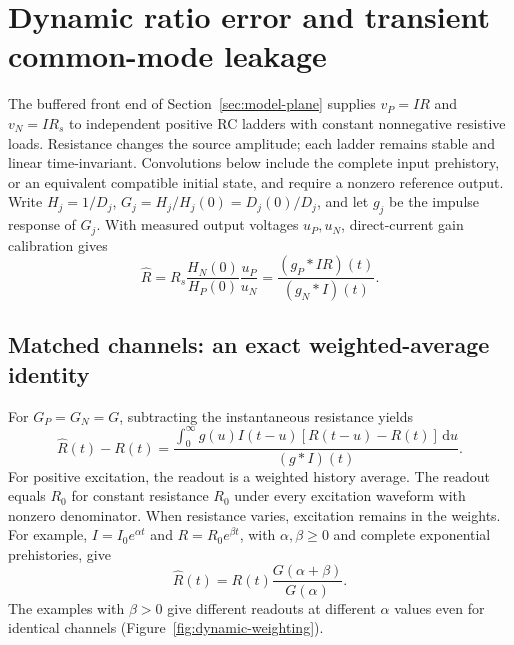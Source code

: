 \section{Dynamic ratio error and transient common-mode leakage}
\label{sec:dynamic}

The buffered front end of Section~\ref{sec:model-plane} supplies $v_P=IR$ and $v_N=IR_s$ to independent positive RC ladders with constant nonnegative resistive loads. Resistance changes the source amplitude; each ladder remains stable and linear time-invariant. Convolutions below include the complete input prehistory, or an equivalent compatible initial state, and require a nonzero reference output. Write $H_j=1/D_j$, $G_j=H_j/H_j(0)=D_j(0)/D_j$, and let $g_j$ be the impulse response of $G_j$. With measured output voltages $u_P,u_N$, direct-current gain calibration gives
\begin{equation}\label{eq:ratio-readout}
\hat R=R_s\frac{H_N(0)}{H_P(0)}\frac{u_P}{u_N}
=\frac{(g_P\ast IR)(t)}{(g_N\ast I)(t)}.
\end{equation}

\subsection{Matched channels: an exact weighted-average identity}
\label{sec:dynamic-matched}

For $G_P=G_N=G$, subtracting the instantaneous resistance yields
\begin{equation}\label{eq:weighted-average}
\hat R(t)-R(t)=\frac{\displaystyle\int_0^\infty g(u)I(t-u)[R(t-u)-R(t)]\,\mathrm du}
{(g\ast I)(t)}.
\end{equation}
For positive excitation, the readout is a weighted history average. The readout equals $R_0$ for constant resistance $R_0$ under every excitation waveform with nonzero denominator. When resistance varies, excitation remains in the weights. For example, $I=I_0e^{\alpha t}$ and $R=R_0e^{\beta t}$, with $\alpha,\beta\ge0$ and complete exponential prehistories, give
\begin{equation}\label{eq:dynamic-exp}
\hat R(t)=R(t)\frac{G(\alpha+\beta)}{G(\alpha)}.
\end{equation}
The examples with $\beta>0$ give different readouts at different $\alpha$ values even for identical channels (Figure~\ref{fig:dynamic-weighting}).

